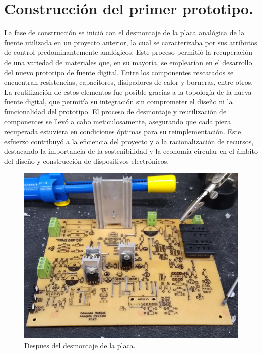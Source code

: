 \section{Construcción del primer prototipo.}
La fase de construcción se inició con el desmontaje de la placa analógica de la fuente utilizada en un proyecto anterior, la cual se caracterizaba por sus atributos de control predominantemente analógicos. Este proceso permitió la recuperación de una variedad de materiales que, en su mayoría, se emplearían en el desarrollo del nuevo prototipo de fuente digital. Entre los componentes rescatados se encuentran resistencias, capacitores, disipadores de calor y borneras, entre otros. La reutilización de estos elementos fue posible gracias a la topología de la nueva fuente digital, que permitía su integración sin comprometer el diseño ni la funcionalidad del prototipo. 
El proceso de desmontaje y reutilización de componentes se llevó a cabo meticulosamente, asegurando que cada pieza recuperada estuviera en condiciones óptimas para su reimplementación. Este esfuerzo contribuyó a la eficiencia del proyecto y a la racionalización de recursos, destacando la importancia de la sostenibilidad y la economía circular en el ámbito del diseño y construcción de dispositivos electrónicos.

\begin{figure}[H]
    \centering
    \includegraphics[scale=0.1]{./imagenes/fotos/desmontada.jpg}
    \caption{Despues del desmontaje de la placa.}
    \label{F:desmontaje_de_la_placa}
\end{figure}

